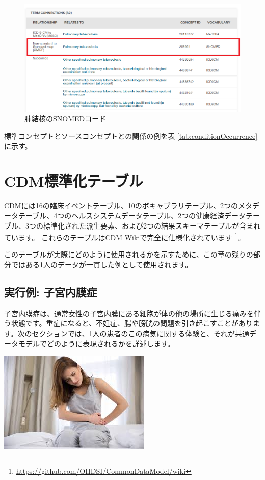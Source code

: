\documentclass[
  11pt]{book}
\theoremstyle{definition}
\theoremstyle{definition}
\theoremstyle{definition}
\theoremstyle{definition}
\theoremstyle{remark}
\begin{document}
\begin{figure}
\includegraphics[width=1\linewidth]{images/CommonDataModel/pulmTubMap} \caption{肺結核のSNOMEDコード}\label{fig:pulmTubMap}
\end{figure}

標準コンセプトとソースコンセプトとの関係の例を表 \ref{tab:conditionOccurrence}に示す。

\section{CDM標準化テーブル}\label{cdmux6a19ux6e96ux5316ux30c6ux30fcux30d6ux30eb}


CDMには16の臨床イベントテーブル、10のボキャブラリテーブル、2つのメタデータテーブル、4つのヘルスシステムデータテーブル、2つの健康経済データテーブル、3つの標準化された派生要素、および2つの結果スキーマテーブルが含まれています。 これらのテーブルはCDM Wikiで完全に仕様化されています \footnote{\url{https://github.com/OHDSI/CommonDataModel/wiki}}。

このテーブルが実際にどのように使用されるかを示すために、この章の残りの部分ではある1人のデータが一貫した例として使用されます。

\subsection{実行例: 子宮内膜症}\label{ux5b9fux884cux4f8b-ux5b50ux5baeux5185ux819cux75c7}

子宮内膜症は、通常女性の子宮内膜にある細胞が体の他の場所に生じる痛みを伴う状態です。重症になると、不妊症、腸や膀胱の問題を引き起こすことがあります。次のセクションでは、1人の患者のこの病気に関する体験と、それが共通データモデルでどのように表現されるかを詳述します。

\begin{center}\includegraphics[width=0.5\linewidth]{images/CommonDataModel/Lauren} \end{center}
\end{document}
